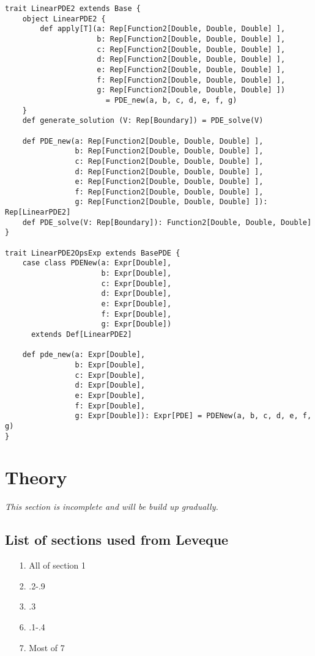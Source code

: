 \begin{verbatim}
trait LinearPDE2 extends Base {
    object LinearPDE2 {
        def apply[T](a: Rep[Function2[Double, Double, Double] ],
                     b: Rep[Function2[Double, Double, Double] ], 
                     c: Rep[Function2[Double, Double, Double] ],
                     d: Rep[Function2[Double, Double, Double] ],
                     e: Rep[Function2[Double, Double, Double] ],
                     f: Rep[Function2[Double, Double, Double] ],
                     g: Rep[Function2[Double, Double, Double] ])
                       = PDE_new(a, b, c, d, e, f, g)
    }
    def generate_solution (V: Rep[Boundary]) = PDE_solve(V)

    def PDE_new(a: Rep[Function2[Double, Double, Double] ],
                b: Rep[Function2[Double, Double, Double] ], 
                c: Rep[Function2[Double, Double, Double] ],
                d: Rep[Function2[Double, Double, Double] ],
                e: Rep[Function2[Double, Double, Double] ],
                f: Rep[Function2[Double, Double, Double] ],
                g: Rep[Function2[Double, Double, Double] ]): Rep[LinearPDE2]
    def PDE_solve(V: Rep[Boundary]): Function2[Double, Double, Double] 
}

trait LinearPDE2OpsExp extends BasePDE {
    case class PDENew(a: Expr[Double],
                      b: Expr[Double],
                      c: Expr[Double],
                      d: Expr[Double],
                      e: Expr[Double],
                      f: Expr[Double],
                      g: Expr[Double])
      extends Def[LinearPDE2]

    def pde_new(a: Expr[Double],
                b: Expr[Double],
                c: Expr[Double],
                d: Expr[Double],
                e: Expr[Double],
                f: Expr[Double],
                g: Expr[Double]): Expr[PDE] = PDENew(a, b, c, d, e, f, g)
}
\end{verbatim}
\section{Theory}
\emph{This section is incomplete and will be build up gradually.}

\subsection{List of sections used from Leveque}
\begin{itemize}
    
\item[1.] All of section 1
\item[2.] .2-.9
\item[3.] .3
\item[6.] .1-.4
\item[7.] Most of 7 
\end{itemize}
